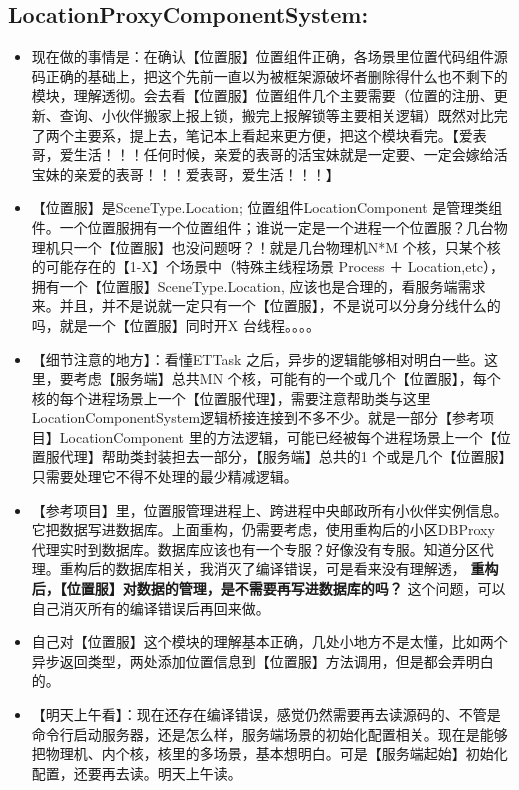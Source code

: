 \documentclass[9pt, b5paper]{article}
\begin{document}
\subsection{LocationProxyComponentSystem:}
\label{sec-5-4}
\begin{itemize}
\item 现在做的事情是：在确认【位置服】位置组件正确，各场景里位置代码组件源码正确的基础上，把这个先前一直以为被框架源破坏者删除得什么也不剩下的模块，理解透彻。会去看【位置服】位置组件几个主要需要（位置的注册、更新、查询、小伙伴搬家上报上锁，搬完上报解锁等主要相关逻辑）既然对比完了两个主要系，提上去，笔记本上看起来更方便，把这个模块看完。【爱表哥，爱生活！！！任何时候，亲爱的表哥的活宝妹就是一定要、一定会嫁给活宝妹的亲爱的表哥！！！爱表哥，爱生活！！！】
\item 【位置服】是SceneType.Location; 位置组件LocationComponent 是管理类组件。一个位置服拥有一个位置组件；谁说一定是一个进程一个位置服？几台物理机只一个【位置服】也没问题呀？！就是几台物理机N*M 个核，只某个核的可能存在的【1-X】个场景中（特殊主线程场景 Process ＋ Location,etc），拥有一个【位置服】SceneType.Location, 应该也是合理的，看服务端需求来。并且，并不是说就一定只有一个【位置服】，不是说可以分身分线什么的吗，就是一个【位置服】同时开X 台线程。。。。
\item 【细节注意的地方】：看懂ETTask 之后，异步的逻辑能够相对明白一些。这里，要考虑【服务端】总共MN 个核，可能有的一个或几个【位置服】，每个核的每个进程场景上一个【位置服代理】，需要注意帮助类与这里LocationComponentSystem逻辑桥接连接到不多不少。就是一部分【参考项目】LocationComponent 里的方法逻辑，可能已经被每个进程场景上一个【位置服代理】帮助类封装担去一部分，【服务端】总共的1 个或是几个【位置服】只需要处理它不得不处理的最少精减逻辑。
\item 【参考项目】里，位置服管理进程上、跨进程中央邮政所有小伙伴实例信息。它把数据写进数据库。上面重构，仍需要考虑，使用重构后的小区DBProxy 代理实时到数据库。数据库应该也有一个专服？好像没有专服。知道分区代理。重构后的数据库相关，我消灭了编译错误，可是看来没有理解透， \textbf{重构后，【位置服】对数据的管理，是不需要再写进数据库的吗？} 这个问题，可以自己消灭所有的编译错误后再回来做。
\item 自己对【位置服】这个模块的理解基本正确，几处小地方不是太懂，比如两个异步返回类型，两处添加位置信息到【位置服】方法调用，但是都会弄明白的。
\item 【明天上午看】：现在还存在编译错误，感觉仍然需要再去读源码的、不管是命令行启动服务器，还是怎么样，服务端场景的初始化配置相关。现在是能够把物理机、内个核，核里的多场景，基本想明白。可是【服务端起始】初始化配置，还要再去读。明天上午读。

\end{itemize}
\end{document}
